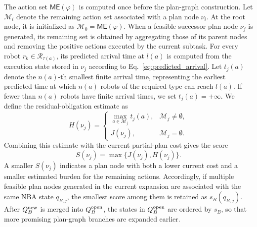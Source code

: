 \documentclass[lettersize,journal]{IEEEtran}
\theoremstyle{italiclemma}
\theoremstyle{italiclemma}
\theoremstyle{definition}
\begin{document}
The action set $\mathsf{ME}(\varphi)$ is computed once before the plan-graph construction. Let $\mathcal M_i$ denote the remaining action set associated with a plan node $\nu_i$. At the root node, it is initialized as $\mathcal M_0=\mathsf{ME}(\varphi)$. When a feasible successor plan node $\nu_j$ is generated, its remaining set is obtained by aggregating those of its parent nodes and removing the positive actions executed by the current subtask. For every robot $r_k\in\mathcal R_{\tau(a)}$, its predicted arrival time at $l(a)$ is computed from the execution state stored in $\nu_j$ according to Eq.~\eqref{eq:predicted_arrival}. Let $t_j(a)$ denote the $n(a)$-th smallest finite arrival time, representing the earliest predicted time at which $n(a)$ robots of the required type can reach $l(a)$. If fewer than $n(a)$ robots have finite arrival times, we set $t_j(a)=+\infty$. We  define the residual-obligation estimate as
\begin{equation}
H(\nu_j)=
\begin{cases}
\displaystyle
\max_{a\in\mathcal M_j} t_j(a),
& \mathcal M_j\neq\emptyset,\\[2mm]
J(\nu_j),
& \mathcal M_j=\emptyset.
\end{cases}
\label{eq:residual_pressure}
\end{equation}
Combining this estimate with the current partial-plan cost gives the score
\begin{equation}
S(\nu_j) = \max\{J(\nu_j),H(\nu_j)\}.
\label{eq:score}
\end{equation}
A smaller $S(\nu_j)$ indicates a plan node with both a lower current cost and a smaller estimated burden for the remaining actions. Accordingly, if multiple feasible plan nodes generated in the current expansion are associated with the same NBA state $q_{B,j}$, the smallest score among them is retained as $s_B(q_{B,j})$. After $Q_B^{\rm new}$ is merged into $Q_B^{\rm open}$, the states in
$Q_B^{\rm open}$ are ordered by $s_B$, so that more promising plan-graph branches are expanded earlier.

\end{document}
